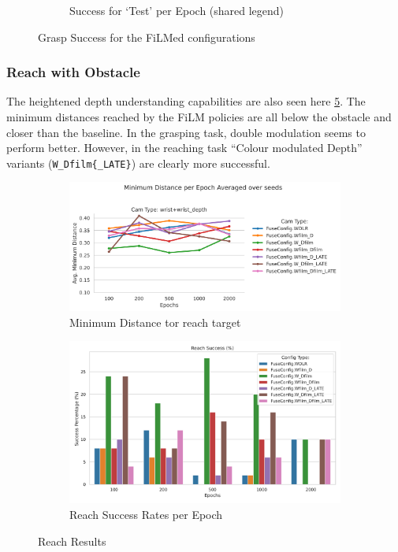 \begin{figure}[H]
\begin{subfigure}{0.30\linewidth}
    \caption{Success for `Test' per Epoch (shared legend)}\label{subfig:film-grasp-test-success-epoochs}
  \end{subfigure}
  
  \caption{Grasp Success for the FiLMed configurations}\label{fig:film-grasp-success}
\end{figure}


\subsubsection{Reach with Obstacle}
The heightened depth understanding capabilities are also seen here \ref{fig:film-reach}. The minimum distances reached by the FiLM policies are all below the obstacle and closer than the baseline. In the grasping task, double modulation seems to perform better. However, in the reaching task ``Colour modulated Depth'' variants (\verb|W_Dfilm{_LATE}|) are clearly more successful.

\begin{figure}[htpb]
  \centering
  \begin{subfigure}{0.40\linewidth}
    \centering
    \includegraphics[width=\linewidth]{assets/evaluation/film/reach-min-cams.png}
    \caption{Minimum Distance tor reach target}\label{subfig:film-reach-min}
  \end{subfigure}
  \begin{subfigure}{0.40\linewidth}
    \centering
    \includegraphics[width=\linewidth]{assets/evaluation/film/base-reach-success-config-epochs.png}
    \caption{Reach Success Rates per Epoch}\label{subfig:film-reach-success}
  \end{subfigure}
  \caption{Reach Results}\label{fig:film-reach}
\end{figure}

